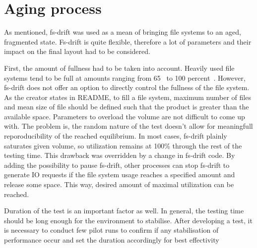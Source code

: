 \documentclass[
  color, %
  table, %
  lof,   %
  lot,   %
]{fithesis3}
\begin{document}
\section{Aging process}
As mentioned, fs-drift was used as a mean of bringing file systems to an aged, fragmented state. Fs-drift is quite flexible, therefore a lot of parameters and their impact on the final layout had to be considered.

First, the amount of fullness had to be taken into account. Heavily used file systems tend to be full at amounts ranging from 65~\cite{Smith:1997:FSA:258623.258689} to 100 percent~\cite{agrawal2007five}. However, fs-drift does not offer an option to directly control the fullness of the file system. As the creator states in README, to fill a file system, maximum number of files and mean size of file should be defined such that the product is greater than the available space. Parameters to overload the volume are not difficult to come up with. The problem is, the random nature of the test doesn't allow for meaningfull reporoducibility of the reached equilibrium. In most cases, fs-drift plainly saturates given volume, so utilization remains at 100\% through the rest of the testing time. This drawback was overridden by a change in fs-drift code\footnotemark[1]. By adding the possibility to pause fs-drift, other processes can stop fs-drift to generate IO requests if the file system usage reaches a specified amount and release some space. This way, desired amount of maximal utilization can be reached.


Duration of the test is an important factor as well. In general, the testing time should be long enough for the environment to stabilise. After developing a test, it is necessary to conduct few pilot runs to confirm if any stabilisation of performance occur and set the duration accordingly for best effectivity






\end{document}
